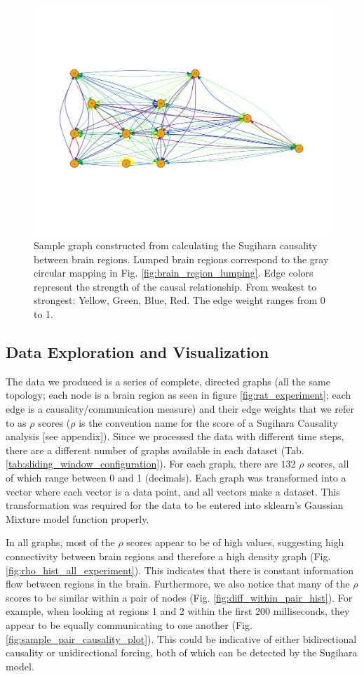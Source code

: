 \documentclass[journal,12pt,onecolumn,draftclsnofoot]{IEEEtran}  %
\begin{document}
\begin{figure}[H]
  \centering
  \includegraphics[width=0.55\linewidth]{figures/sample_graph.pdf}
  \caption{Sample graph constructed from calculating the Sugihara causality between brain regions. Lumped brain regions correspond to the gray circular mapping in Fig. \ref{fig:brain_region_lumping}. Edge colors represent the strength of the causal relationship. From weakest to strongest: Yellow, Green, Blue, Red. The edge weight ranges from 0 to 1.}
  \label{fig:sample_graph}
\end{figure}

\subsection{Data Exploration and Visualization}
The data we produced is a series of complete, directed graphs (all the same topology; each node is a brain region as seen in figure \ref{fig:rat_experiment}; each edge is a causality/communication measure) and their edge weights that we refer to as $\rho$ scores ($\rho$ is the convention name for the score of a Sugihara Causality analysis [see appendix]). Since we processed the data with different time steps, there are a different number of graphs available in each dataset (Tab. \ref{tab:sliding_window_configuration}). For each graph, there are $132$ $\rho$ scores, all of which range between 0 and 1 (decimals). Each graph was transformed into a vector where each vector is a data point, and all vectors make a dataset. This transformation was required for the data to be entered into sklearn's Gaussian Mixture model function properly.

In all graphs, most of the $\rho$ scores appear to be of high values, suggesting high connectivity between brain regions and therefore a high density graph (Fig. \ref{fig:rho_hist_all_experiment}). This indicates that there is constant information flow between regions in the brain. Furthermore, we also notice that many of the $\rho$ scores to be similar within a pair of nodes (Fig. \ref{fig:diff_within_pair_hist}). For example, when looking at regions 1 and 2 within the first 200 milliseconds, they appear to be equally communicating to one another (Fig. \ref{fig:sample_pair_causality_plot}). This could be indicative of either bidirectional causality or unidirectional forcing, both of which can be detected by the Sugihara model.
\end{document}
